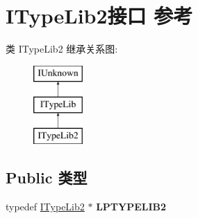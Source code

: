 \hypertarget{interface_i_type_lib2}{}\section{I\+Type\+Lib2接口 参考}
\label{interface_i_type_lib2}
类 I\+Type\+Lib2 继承关系图\+:\begin{figure}[H]
\begin{center}
\leavevmode
\includegraphics[height=3.000000cm]{interface_i_type_lib2}
\end{center}
\end{figure}
\subsection*{Public 类型}
\begin{DoxyCompactItemize}
\item 
\mbox{\label{interface_i_type_lib2_ae2bf97f47b60598dd74760693ad1619d}} 
typedef \hyperlink{interface_i_type_lib2}{I\+Type\+Lib2} $\ast$ {\bfseries L\+P\+T\+Y\+P\+E\+L\+I\+B2}
\end{DoxyCompactItemize}

